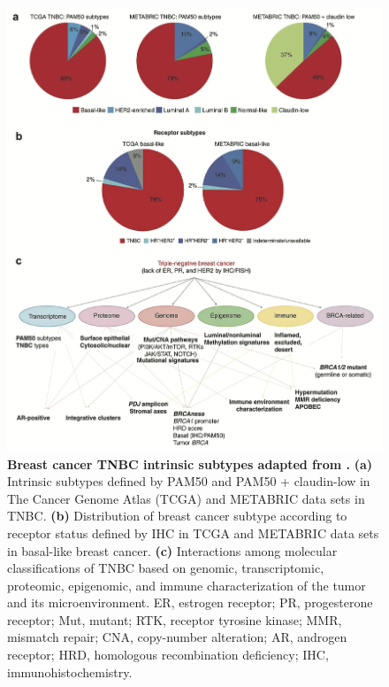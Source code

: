 \begin{figure}
\centering
\includegraphics[width=\textwidth]{Figures/chap1/Breastcancersubtypes.png}
	\caption[Breast cancer subtypes]
	{\small
	    \textbf{Breast cancer TNBC intrinsic subtypes adapted from \cite{garrido2019insights}.}
	    \textbf{(a)} Intrinsic subtypes defined by PAM50 and PAM50 + claudin-low in The Cancer Genome Atlas (TCGA) and METABRIC data sets in \ac{TNBC}.
	    \textbf{(b)} Distribution of breast cancer subtype according to receptor status defined by IHC in TCGA and METABRIC data sets in basal-like breast cancer.
	    \textbf{(c)} Interactions among molecular classifications of TNBC based on genomic, transcriptomic, proteomic, epigenomic, and immune characterization of the tumor and its microenvironment. ER, estrogen receptor; PR, progesterone receptor; Mut, mutant; RTK, receptor tyrosine kinase; MMR, mismatch repair; CNA, copy-number alteration; AR, androgen receptor; HRD, homologous recombination deficiency; IHC, immunohistochemistry.
	}
	\label{fig:Breastcancersubtypes}
\end{figure}

